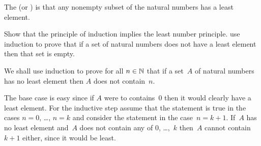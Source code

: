 \documentclass{ibl}  %
\begin{document}
\begin{df}
The  
(or )
is that any nonempty 
subset of the natural
numbers has a least element.  
\end{df}

\begin{ex}
Show that the principle of induction implies the least number 
principle.
\hint
use induction to prove that if a set of natural numbers does not
have a least element then that set is empty.
\begin{ans}
We shall use induction to prove for all $n\in\mathbb{N}$ that if a set~$A$ 
of natural numbers has no
least element then $A$ does not contain~$n$.

The base case is easy since if $A$ were to contains~$0$ then it would
clearly have a least element.
For the inductive step assume that the statement is true in the cases
$n=0$, \ldots, $n=k$ and consider the statement in the case~$n=k+1$.
If~$A$ has no least element and~$A$ does not contain any of $0$, \ldots,~$k$ 
then~$A$ cannot contain~$k+1$ either, since it would be least.   
\end{ans}
\end{ex}





\end{document}
